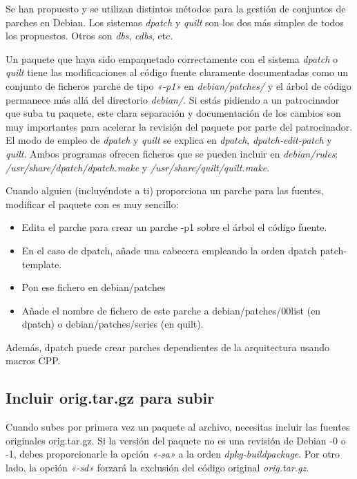 \documentclass[letterpaper,12pt,spanish]{manual}
\begin{document}
Se han propuesto y se utilizan distintos métodos para la gestión de conjuntos de parches en Debian. Los sistemas \emph{dpatch} y \emph{quilt} son los dos más simples de todos los propuestos. Otros son \emph{dbs}, \emph{cdbs}, etc.

Un paquete que haya sido empaquetado correctamente con el sistema \emph{dpatch} o \emph{quilt} tiene las modificaciones al código fuente claramente documentadas como un conjunto de ficheros parche de tipo \emph{«-p1»} en \emph{debian/patches/} y el árbol de código permanece más allá del directorio \emph{debian/}. Si estás pidiendo a un patrocinador que suba tu paquete, este clara separación y documentación de los cambios son muy importantes para acelerar la revisión del paquete por parte del patrocinador. El modo de empleo de \emph{dpatch} y \emph{quilt} se explica en \emph{dpatch}, \emph{dpatch-edit-patch} y \emph{quilt}. Ambos programas ofrecen ficheros que se pueden incluir en \emph{debian/rules}: \emph{/usr/share/dpatch/dpatch.make} y \emph{/usr/share/quilt/quilt.make}.

Cuando alguien (incluyéndote a ti) proporciona un parche para las fuentes, modificar el paquete con es muy sencillo:
\begin{itemize}
\item {} 
Edita el parche para crear un parche -p1 sobre el árbol el código fuente.

\item {} 
En el caso de dpatch, añade una cabecera empleando la orden dpatch patch-template.

\item {} 
Pon ese fichero en debian/patches

\item {} 
Añade el nombre de fichero de este parche a debian/patches/00list (en dpatch) o debian/patches/series (en quilt).

\end{itemize}

Además, dpatch puede crear parches dependientes de la arquitectura usando macros CPP.


\subsection{Incluir orig.tar.gz para subir}

Cuando subes por primera vez un paquete al archivo, necesitas incluir las fuentes originales orig.tar.gz. Si la versión del paquete no es una revisión de Debian -0 o -1, debes proporcionarle la opción \emph{«-sa»} a la orden \emph{dpkg-buildpackage}. Por otro lado, la opción \emph{«-sd»} forzará la exclusión del código original \emph{orig.tar.gz}.
\end{document}
